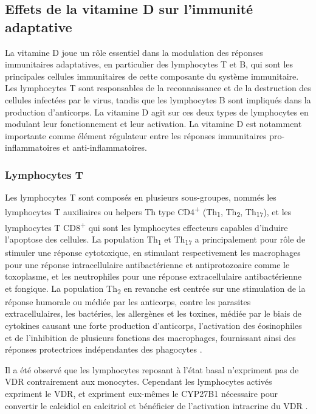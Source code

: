 \documentclass[
  a4paper,
  DIV=11,
  numbers=noendperiod,
  listof=totoc]{scrreprt}
\begin{document}
\subsection{Effets de la vitamine D sur l'immunité
adaptative}\label{effets-de-la-vitamine-d-sur-limmunituxe9-adaptative}

La vitamine D joue un rôle essentiel dans la modulation des réponses
immunitaires adaptatives, en particulier des lymphocytes T et B, qui
sont les principales cellules immunitaires de cette composante du
système immunitaire. Les lymphocytes T sont responsables de la
reconnaissance et de la destruction des cellules infectées par le virus,
tandis que les lymphocytes B sont impliqués dans la production
d'anticorps. La vitamine D agit sur ces deux types de lymphocytes en
modulant leur fonctionnement et leur activation. La vitamine D est
notamment importante comme élément régulateur entre les réponses
immunitaires pro-inflammatoires et anti-inflammatoires.

\subsubsection{Lymphocytes T}\label{lymphocytes-t}

Les lymphocytes T sont composés en plusieurs sous-groupes, nommés les
lymphocytes T auxiliaires ou helpers \acs{Th} type
CD4\textsuperscript{+} (Th\textsubscript{1}, Th\textsubscript{2},
Th\textsubscript{17}), et les lymphocytes T CD8\textsuperscript{+} qui
sont les lymphocytes effecteurs capables d'induire l'apoptose des
cellules. La population Th\textsubscript{1} et Th\textsubscript{17} a
principalement pour rôle de stimuler une réponse cytotoxique, en
stimulant respectivement les macrophages pour une réponse
intracellulaire antibactérienne et antiprotozoaire comme le toxoplasme,
et les neutrophiles pour une réponse extracellulaire antibactérienne et
fongique. La population Th\textsubscript{2} en revanche est centrée sur
une stimulation de la réponse humorale ou médiée par les anticorps,
contre les parasites extracellulaires, les bactéries, les allergènes et
les toxines, médiée par le biais de cytokines causant une forte
production d'anticorps, l'activation des éosinophiles et de l'inhibition
de plusieurs fonctions des macrophages, fournissant ainsi des réponses
protectrices indépendantes des phagocytes
\autocite{Cantorna.2015,Walker.2018}.

Il a été observé que les lymphocytes reposant à l'état basal n'expriment
pas de \ac{VDR} contrairement aux monocytes. Cependant les lymphocytes
activés expriment le \ac{VDR}, et expriment eux-mêmes le \ac{CYP27B1}
nécessaire pour convertir le calcidiol en calcitriol et bénéficier de
l'activation intracrine du \ac{VDR} \autocite{Charoenngam.2020}.
\end{document}
